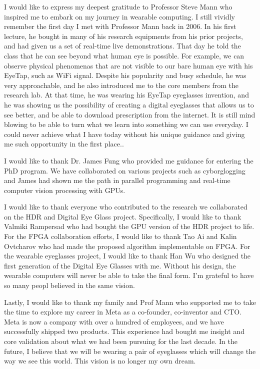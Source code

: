 I would like to express my deepest gratitude to Professor Steve Mann who inspired me to embark on my journey in wearable computing. I still vividly remember the first day I met with Professor Mann back in 2006. In his first lecture, he bought in many of his research equipments from his prior projects, and had given us a set of real-time live demonstrations. That day he told the class that he can see beyond what human eye is possible. For example, we can observe physical phenomenas that are not visible to our bare human eye with his EyeTap, such as WiFi signal. Despite his popularity and busy schedule, he was very approachable, and he also introduced me to the core members from the research lab. At that time, he was wearing his EyeTap eyeglasses invention, and he was showing us the possibility of creating a digital eyeglasses that allows us to see better, and be able to download prescription from the internet. It is still mind blowing to be able to turn what we learn into something we can use everyday. I could never achieve what I have today without his unique guidance and giving me such opportunity in the first place.. 

I would like to thank Dr. James Fung who provided me guidance for entering the PhD program. We have collaborated on various projects such as cyborglogging and James had shown me the path in parallel programming and real-time computer vision processing with GPUs. 

I would like to thank everyone who contributed to the research we collaborated on the HDR and Digital Eye Glass project. Specifically, I would like to thank Valmiki Rampersad who had bought the GPU version of the HDR project to life. For the FPGA collaboration efforts, I would like to thank Tao Ai and Kalin Ovtcharov who had made the proposed algorithm implementable on FPGA. For the wearable eyeglasses project, I would like to thank Han Wu who designed the first generation of the Digital Eye Glasses with me. Without his design, the wearable computers will never be able to take the final form. I'm grateful to have so many peopl believed in the same vision.
 
Lastly, I would like to thank my family and Prof Mann who supported me to take the time to explore my career in Meta as a co-founder, co-inventor and CTO. Meta is now a company with over a hundred of employees, and we have successfully shipped two products. This experience had bought me insight and core validation about what we had been pursuing for the last decade. In the future, I believe that we will be wearing a pair of eyeglasses which will change the way we see this world. This vision is no longer my own dream. 